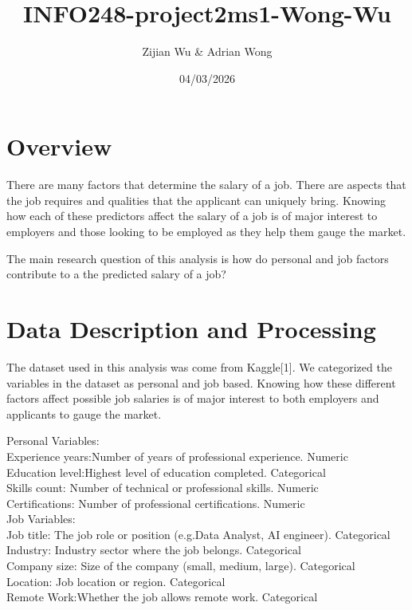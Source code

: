 \documentclass[
]{article}
\title{INFO248-project2ms1-Wong-Wu}
\author{Zijian Wu \& Adrian Wong}
\date{04/03/2026}
\begin{document}
\maketitle

\section{Overview}\label{overview}

There are many factors that determine the salary of a job. There are
aspects that the job requires and qualities that the applicant can
uniquely bring. Knowing how each of these predictors affect the salary
of a job is of major interest to employers and those looking to be
employed as they help them gauge the market.

The main research question of this analysis is how do personal and job
factors contribute to a the predicted salary of a job?

\section{Data Description and
Processing}\label{data-description-and-processing}

The dataset used in this analysis was come from Kaggle{[}1{]}. We
categorized the variables in the dataset as personal and job based.
Knowing how these different factors affect possible job salaries is of
major interest to both employers and applicants to gauge the market.

Personal Variables:\\
Experience years:Number of years of professional experience. Numeric\\
Education level:Highest level of education completed. Categorical\\
Skills count: Number of technical or professional skills. Numeric\\
Certifications: Number of professional certifications. Numeric\\

Job Variables:\\
Job title: The job role or position (e.g.Data Analyst, AI engineer).
Categorical\\
Industry: Industry sector where the job belongs. Categorical\\
Company size: Size of the company (small, medium, large). Categorical\\
Location: Job location or region. Categorical\\
Remote Work:Whether the job allows remote work. Categorical\\
\end{document}
